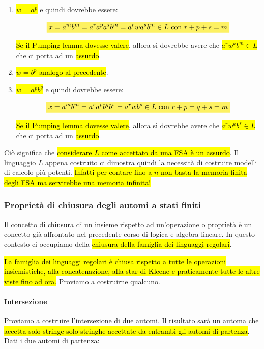 \documentclass[a4paper,11pt,twoside]{article}
\theoremstyle{plain}
\theoremstyle{definition}
\theoremstyle{remark}
\newcommand{\mhl}[1]{\colorbox{hlcolor}{$\displaystyle #1$}}
\begin{document}
\begin{enumerate}
  \item \hl{$w = a^p$} e quindi dovrebbe essere:

    \begin{equation}
      \mhl{
      x = a^m b^m = a^r a^p a^s b^m = a^r w a^s b^m \in L \text{ con } r+p+s=m
      }
    \end{equation}

    \hl{Se il Pumping lemma dovesse valere}, allora si dovrebbe avere che
    \hl{$a^r w^k b^m \in L$} che ci porta ad un \hl{assurdo}.
  \item \hl{$w = b^p$ analogo al precedente}.
  \item \hl{$w = a^p b^q$} e quindi dovrebbe essere:

    \begin{equation}
      \mhl{
      x = a^m b^m = a^r a^p b^q b^s = a^r w b^s \in L \text{ con } r+p=q+s=m
      }
    \end{equation}

    \hl{Se il Pumping lemma dovesse valere}, allora si dovrebbe avere che
    \hl{$a^r w^k b^s \in L$} che ci porta ad un \hl{assurdo}.
\end{enumerate}

Ciò significa che \hl{considerare $L$ come accettato da una FSA è un assurdo}.
Il linguaggio $L$ appena costruito ci dimostra quindi la necessità di costruire
modelli di calcolo più potenti. \hl{Infatti per contare fino a $n$ non basta la
memoria finita degli FSA ma servirebbe una memoria infinita!}

\subsubsection{Proprietà di chiusura degli automi a stati finiti}\label{sec:chiusura-fsa}

Il concetto di chiusura di un insieme rispetto ad un'operazione o proprietà è
un concetto già affrontato nel precedente corso di logica e algebra lineare. In
questo contesto ci occupiamo della \hl{chiusura della famiglia dei linguaggi
regolari}.

\hl{La famiglia dei linguaggi regolari è chiusa rispetto a tutte le operazioni
insiemistiche, alla concatenazione, alla star di Kleene e praticamente tutte le
altre viste fino ad ora.} Proviamo a costruirne qualcuno.

\paragraph{Intersezione} Proviamo a costruire l'intersezione di due automi. Il
risultato sarà un automa che \hl{accetta solo stringe solo stringhe accettate da
entrambi gli automi di partenza}. Dati i due automi di partenza:
\end{document}
